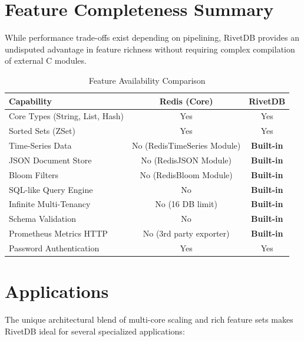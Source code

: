\section{Feature Completeness Summary}

While performance trade-offs exist depending on pipelining, RivetDB provides an undisputed advantage in feature richness without requiring complex compilation of external C modules.

\begin{table}[htbp]
\caption{Feature Availability Comparison}
\label{tab:feature_comp}
\centering
\renewcommand{\arraystretch}{1.5}
\begin{tabular}{@{}lcc@{}}
\toprule
\textbf{Capability} & \textbf{Redis (Core)} & \textbf{RivetDB} \\
\midrule
Core Types (String, List, Hash) & Yes & Yes \\
Sorted Sets (ZSet) & Yes & Yes \\
Time-Series Data & No (RedisTimeSeries Module) & \textbf{Built-in} \\
JSON Document Store & No (RedisJSON Module) & \textbf{Built-in} \\
Bloom Filters & No (RedisBloom Module) & \textbf{Built-in} \\
SQL-like Query Engine & No & \textbf{Built-in} \\
Infinite Multi-Tenancy & No (16 DB limit) & \textbf{Built-in} \\
Schema Validation & No & \textbf{Built-in} \\
Prometheus Metrics HTTP & No (3rd party exporter) & \textbf{Built-in} \\
Password Authentication & Yes & Yes \\
\end{tabular}
\end{table}

\section{Applications}

The unique architectural blend of multi-core scaling and rich feature sets makes RivetDB ideal for several specialized applications:

